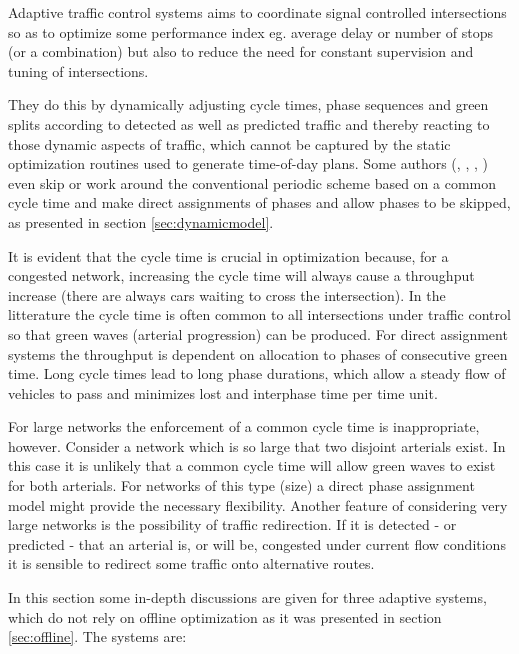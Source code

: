 \label{sec:adaptive_cooperation}

Adaptive traffic control systems aims to coordinate signal controlled
intersections so as to optimize some performance index eg. average
delay or number of stops (or a combination) but also to reduce the
need for constant supervision and tuning of intersections.

They do this by dynamically adjusting cycle times, phase sequences and
green splits according to detected as well as predicted traffic and
thereby reacting to those dynamic aspects of traffic, which cannot be
captured by the static optimization routines used to generate
time-of-day plans. Some authors (\cite{1}, \cite{44}, \cite{46},
\cite{scoot2004}) even skip or work around the conventional periodic
scheme based on a common cycle time and make direct assignments of
phases and allow phases to be skipped, as presented in section
\ref{sec:dynamicmodel}.

It is evident that the cycle time is crucial in optimization because,
for a congested network, increasing the cycle time will always cause a
throughput increase (there are always cars waiting to cross the
intersection). In the litterature the cycle time is often common to
all intersections under traffic control so that green waves (arterial
progression) can be produced. For direct assignment systems the
throughput is dependent on allocation to phases of consecutive green
time. Long cycle times lead to long phase durations, which allow a
steady flow of vehicles to pass and minimizes lost and interphase time
per time unit.

For large networks the enforcement of a common cycle time is
inappropriate, however. Consider a network which is so large that two
disjoint arterials exist. In this case it is unlikely that a common
cycle time will allow green waves to exist for both arterials. For
networks of this type (size) a direct phase assignment model might
provide the necessary flexibility. Another feature of considering very
large networks is the possibility of traffic redirection. If it is
detected - or predicted - that an arterial is, or will be, congested
under current flow conditions it is sensible to redirect some traffic
onto alternative routes.

In this section some in-depth discussions are given for three adaptive
systems, which do not rely on offline optimization as it was presented
in section \ref{sec:offline}. The systems are:

